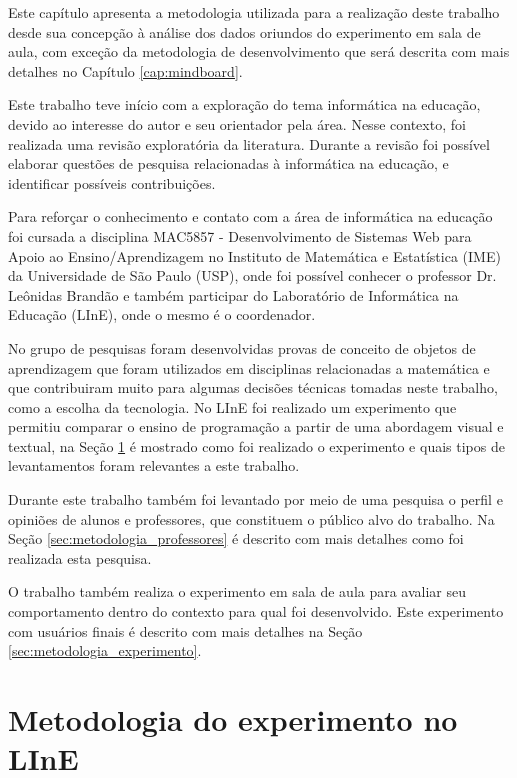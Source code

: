 Este capítulo apresenta a metodologia utilizada para a realização deste trabalho desde sua concepção à análise dos dados oriundos do experimento em sala de aula, com exceção da  metodologia de desenvolvimento que será descrita com mais detalhes no Capítulo \ref{cap:mindboard}. 

Este trabalho teve início com a exploração do tema informática na educação, devido ao interesse do autor e seu orientador pela área. Nesse contexto, foi realizada uma revisão exploratória da literatura. Durante a revisão foi possível elaborar questões de pesquisa relacionadas à informática na educação, e identificar possíveis contribuições.

Para reforçar o conhecimento e contato com a área de informática na educação foi cursada a disciplina MAC5857 - Desenvolvimento de Sistemas Web para Apoio ao Ensino/Aprendizagem no Instituto de Matemática e Estatística (IME) da Universidade de São Paulo (USP), onde foi possível conhecer o professor Dr. Leônidas Brandão e também participar do Laboratório de Informática na Educação (LInE), onde o mesmo é o coordenador.

No grupo de pesquisas foram desenvolvidas provas de conceito de objetos de aprendizagem que foram utilizados em disciplinas relacionadas a matemática e que contribuiram muito para algumas decisões técnicas tomadas neste trabalho, como a escolha da tecnologia. No LInE foi realizado um experimento que permitiu comparar o ensino de programação a partir de uma abordagem visual e textual, na Seção \ref{sec:metodologia_line} é mostrado como foi realizado o experimento e quais tipos de levantamentos foram relevantes a este trabalho.

Durante este trabalho também foi levantado por meio de uma pesquisa o perfil e opiniões de alunos e professores, que constituem o público alvo do trabalho. Na Seção \ref{sec:metodologia_professores} é descrito com mais detalhes como foi realizada esta pesquisa.

O trabalho também realiza o experimento em sala de aula para avaliar seu comportamento dentro do contexto para qual foi desenvolvido. Este experimento com usuários finais é descrito com mais detalhes na Seção \ref{sec:metodologia_experimento}.

\section{Metodologia do experimento no LInE}
\label{sec:metodologia_line}

